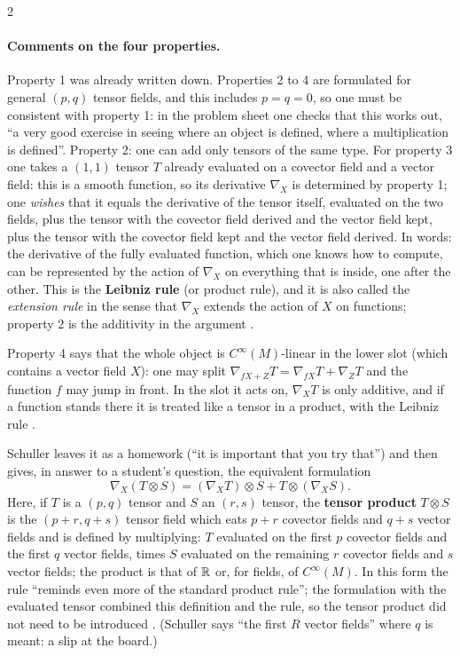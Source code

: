 \begin{paracol}{2}
\paragraph{Comments on the four properties.} Property 1 was already written down. Properties 2 to 4 are formulated for general $(p,q)$ tensor fields, and this includes $p=q=0$, so one must be consistent with property 1: in the problem sheet one checks that this works out, ``a very good exercise in seeing where an object is defined, where a multiplication is defined''. Property 2: one can add only tensors of the same type.
For property 3 one takes a $(1,1)$ tensor $T$ already evaluated on a covector field and a vector field: this is a smooth function, so its derivative $\nabla_X$ is determined by property 1; one \emph{wishes} that it equals the derivative of the tensor itself, evaluated on the two fields, plus the tensor with the covector field derived and the vector field kept, plus the tensor with the covector field kept and the vector field derived. In words: the derivative of the fully evaluated function, which one knows how to compute, can be represented by the action of $\nabla_X$ on everything that is inside, one after the other. This is the \textbf{Leibniz rule} (or product rule), and it is also called the \emph{extension rule} in the sense that $\nabla_X$ extends the action of $X$ on functions; property 2 is the additivity in the argument
.

Property 4 says that the whole object is $C^\infty(M)$-linear in the lower slot (which contains a vector field $X$): one may split $\nabla_{fX+Z}T=\nabla_{fX}T+\nabla_ZT$ and the function $f$ may jump in front. In the slot it acts on, $\nabla_XT$ is only additive, and if a function stands there it is treated like a tensor in a product, with the Leibniz rule
.

\begin{coursenote}
Schuller leaves it as a homework (``it is important that you try that'') and then gives, in answer to a student's question, the equivalent formulation
\[
  \nabla_X(T\otimes S)=(\nabla_XT)\otimes S+T\otimes(\nabla_XS).
\]
Here, if $T$ is a $(p,q)$ tensor and $S$ an $(r,s)$ tensor, the \textbf{tensor product} $T\otimes S$ is the $(p+r,q+s)$ tensor field which eats $p+r$ covector fields and $q+s$ vector fields and is defined by multiplying: $T$ evaluated on the first $p$ covector fields and the first $q$ vector fields, times $S$ evaluated on the remaining $r$ covector fields and $s$ vector fields; the product is that of $\mathbb{R}$ or, for fields, of $C^\infty(M)$. In this form the rule ``reminds even more of the standard product rule''; the formulation with the evaluated tensor combined this definition and the rule, so the tensor product did not need to be introduced
.
(Schuller says ``the first $R$ vector fields'' where $q$ is meant: a slip at the board.)
\end{coursenote}


\end{paracol}
